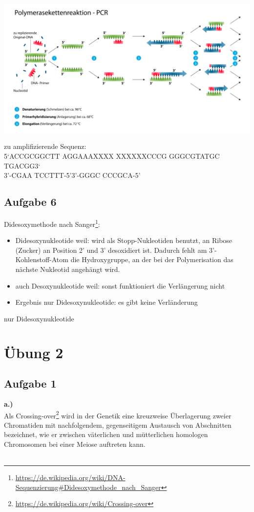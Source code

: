 \documentclass[13pt,a4paper]{article}
\begin{document}
\includegraphics[width=1\textwidth]{pix/exercise1/1024px-Polymerasekettenreaktion.png}

zu amplifizierende Sequenz:\\
5‘ACCGCGGCTT AGGAAAXXXX XXXXXXCCCG GGGCGTATGC TGACGG3‘\\
\noindent\hspace*{17mm}3'-CGAA TCCTTT-5'\hspace*{23mm}3'-GGGC CCCGCA-5'

\subsection{Aufgabe 6}
Didesoxymethode nach Sanger\footnote{\url{https://de.wikipedia.org/wiki/DNA-Sequenzierung\#Didesoxymethode_nach_Sanger}}:
\begin{itemize}
	\item Didesoxynukleotide weil: wird als Stopp-Nukleotiden benutzt, an Ribose (Zucker) an Position 2' und 3' desoxidiert ist. Dadurch fehlt am 3'-Kohlenstoff-Atom die Hydroxygruppe, an der bei der Polymerisation das nächste Nukleotid angehängt wird.
	\item auch Desoxynukleotide weil: sonst funktioniert die Verlängerung nicht
	\item Ergebnis nur Didesoxynukleotide: es gibt keine Verländerung
\end{itemize}
nur Didesoxynukleotide

\newpage
\section{Übung 2}

\subsection{Aufgabe 1}
\textbf{a.)}\\
Als Crossing-over\footnote{\url{https://de.wikipedia.org/wiki/Crossing-over}} wird in der Genetik eine kreuzweise Überlagerung zweier Chromatiden mit nachfolgendem, gegenseitigem Austausch von Abschnitten bezeichnet, wie er zwischen väterlichen und mütterlichen homologen Chromosomen bei einer Meiose auftreten kann.
\\\\
\end{document}

